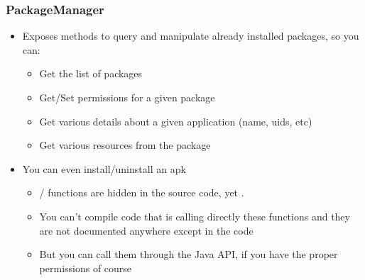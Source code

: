\begin{frame}
  \frametitle{PackageManager}
    \begin{itemize}
    \item Exposes methods to query and manipulate already installed
      packages, so you can:
      \begin{itemize}
      \item Get the list of packages
      \item Get/Set permissions for a given package
      \item Get various details about a given application (name,
        uids, etc)
      \item Get various resources from the package
      \end{itemize}
    \item You can even install/uninstall an apk
      \begin{itemize}
      \item {}/ functions are
        hidden in the source code, yet .
      \item You can't compile code that is calling directly these
        functions and they are not documented anywhere except in the
        code
      \item But you can call them through the Java 
        API, if you have the proper permissions of course
      \end{itemize}
    \end{itemize}
\end{frame}

